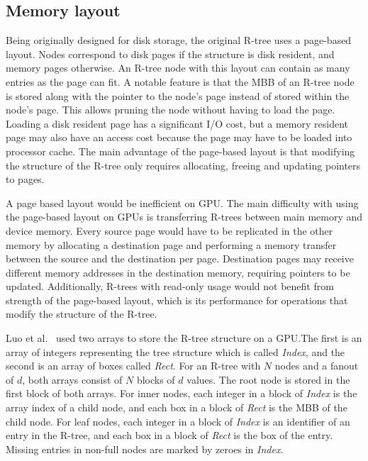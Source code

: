 \subsection{Memory layout}

Being originally designed for disk storage, the original R-tree uses a page-based layout. Nodes correspond to disk pages if the structure is disk resident, and memory pages otherwise. An R-tree node with this layout can contain as many entries as the page can fit. A notable feature is that the MBB of an R-tree node is stored along with the pointer to the node's page instead of stored within the node's page. This allows pruning the node without having to load the page. Loading a disk resident page has a significant I/O cost, but a memory resident page may also have an access cost because the page may have to be loaded into processor cache. The main advantage of the page-based layout is that modifying the structure of the R-tree only requires allocating, freeing and updating pointers to pages.

A page based layout would be inefficient on GPU. The main difficulty with using the page-based layout on GPUs is transferring R-trees between main memory and device memory. Every source page would have to be replicated in the other memory by allocating a destination page and performing a memory transfer between the source and the destination per page. Destination pages may receive different memory addresses in the destination memory, requiring pointers to be updated. Additionally, R-trees with read-only usage would not benefit from strength of the page-based layout, which is its performance for operations that modify the structure of the R-tree.

Luo et al.~\cite{luo2012parallel} used two arrays to store the R-tree structure on a GPU.\@ The first is an array of integers representing the tree structure which is called \emph{Index}, and the second is an array of boxes called \emph{Rect}. For an R-tree with \(N\) nodes and a fanout of \(d\), both arrays consist of \(N\) blocks of \(d\) values. The root node is stored in the first block of both arrays. For inner nodes, each integer in a block of \emph{Index} is the array index of a child node, and each box in a block of \emph{Rect} is the MBB of the child node. For leaf nodes, each integer in a block of \emph{Index} is an identifier of an entry in the R-tree, and each box in a block of \emph{Rect} is the box of the entry. Missing entries in non-full nodes are marked by zeroes in \emph{Index}.

